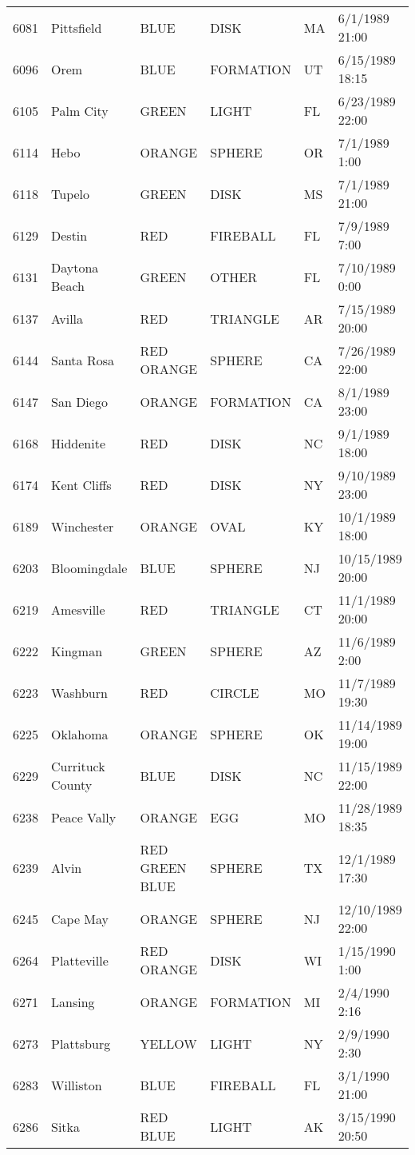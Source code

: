\begin{tabular}{llllll}
6081 & Pittsfield & BLUE & DISK & MA & 6/1/1989 21:00 \\
6096 & Orem & BLUE & FORMATION & UT & 6/15/1989 18:15 \\
6105 & Palm City & GREEN & LIGHT & FL & 6/23/1989 22:00 \\
6114 & Hebo & ORANGE & SPHERE & OR & 7/1/1989 1:00 \\
6118 & Tupelo & GREEN & DISK & MS & 7/1/1989 21:00 \\
6129 & Destin & RED & FIREBALL & FL & 7/9/1989 7:00 \\
6131 & Daytona Beach & GREEN & OTHER & FL & 7/10/1989 0:00 \\
6137 & Avilla & RED & TRIANGLE & AR & 7/15/1989 20:00 \\
6144 & Santa Rosa & RED ORANGE & SPHERE & CA & 7/26/1989 22:00 \\
6147 & San Diego & ORANGE & FORMATION & CA & 8/1/1989 23:00 \\
6168 & Hiddenite & RED & DISK & NC & 9/1/1989 18:00 \\
6174 & Kent Cliffs & RED & DISK & NY & 9/10/1989 23:00 \\
6189 & Winchester & ORANGE & OVAL & KY & 10/1/1989 18:00 \\
6203 & Bloomingdale & BLUE & SPHERE & NJ & 10/15/1989 20:00 \\
6219 & Amesville & RED & TRIANGLE & CT & 11/1/1989 20:00 \\
6222 & Kingman & GREEN & SPHERE & AZ & 11/6/1989 2:00 \\
6223 & Washburn & RED & CIRCLE & MO & 11/7/1989 19:30 \\
6225 & Oklahoma & ORANGE & SPHERE & OK & 11/14/1989 19:00 \\
6229 & Currituck County & BLUE & DISK & NC & 11/15/1989 22:00 \\
6238 & Peace Vally & ORANGE & EGG & MO & 11/28/1989 18:35 \\
6239 & Alvin & RED GREEN BLUE & SPHERE & TX & 12/1/1989 17:30 \\
6245 & Cape May & ORANGE & SPHERE & NJ & 12/10/1989 22:00 \\
6264 & Platteville & RED ORANGE & DISK & WI & 1/15/1990 1:00 \\
6271 & Lansing & ORANGE & FORMATION & MI & 2/4/1990 2:16 \\
6273 & Plattsburg & YELLOW & LIGHT & NY & 2/9/1990 2:30 \\
6283 & Williston & BLUE & FIREBALL & FL & 3/1/1990 21:00 \\
6286 & Sitka & RED BLUE & LIGHT & AK & 3/15/1990 20:50 \\

\end{tabular}
